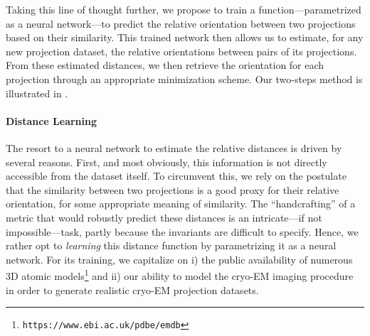 Taking this line of thought further, we propose to train a function---parametrized as a neural network---to predict the relative orientation between two projections based on their similarity. This trained network then allows us to estimate, for any new projection dataset, the relative orientations between pairs of its projections. From these estimated distances, we then retrieve the orientation for each projection through an appropriate minimization scheme. Our two-steps method is illustrated in .



\paragraph{Distance Learning}
The resort to a neural network to estimate the relative distances is driven by several reasons. First, and most obviously, this information is not directly accessible from the dataset itself. To circumvent this, we rely on the postulate that the similarity between two projections is a good proxy for their relative orientation, for some appropriate meaning of similarity. The ``handcrafting'' of a metric that would robustly predict these distances is an intricate---if not impossible---task, partly because the invariants are difficult to specify. Hence, we rather opt to \textit{learning} this distance function by parametrizing it as a neural network. For its training, we capitalize on i) the public availability of numerous 3D atomic models\footnote{\texttt{https://www.ebi.ac.uk/pdbe/emdb}} and ii) our ability to model the cryo-EM imaging procedure in order to generate realistic cryo-EM projection datasets.


